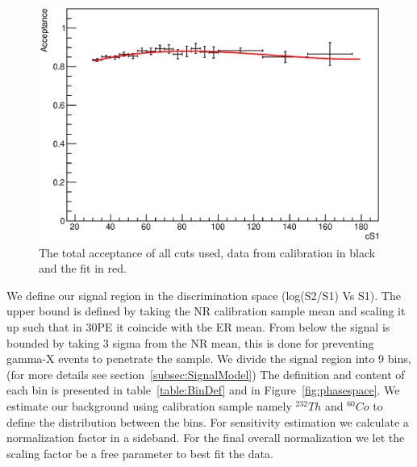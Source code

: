 \begin{figure}[h!]
\begin{minipage}{1.\linewidth}
\centerline{\includegraphics[width=1.\linewidth]{Figures/Acceptance.eps}}
\end{minipage}
\caption{The total acceptance of all cuts used, data from calibration in black and the fit in red.}
\label{fig:Acc}
\end{figure}

We define our signal region in the discrimination space (log(S2/S1) Vs S1). The upper bound is defined by taking the NR calibration sample mean and scaling it up such that in 30PE it coincide with the ER mean. From below the signal is bounded by taking 3 sigma from the NR mean, this is done for preventing gamma-X events to penetrate the sample.
We divide the signal region into 9 bins, (for more details see section~\ref{subsec:SignalModel}) The definition and content of each bin is presented in table~\ref{table:BinDef} and in Figure~\ref{fig:phasespace}. We estimate our background using calibration sample namely $^{232}Th$ and $^{60}Co$ to define the distribution between the bins. For sensitivity estimation we calculate a normalization factor in a sideband. For the final overall normalization we let the scaling factor be a free parameter to best fit the data.

